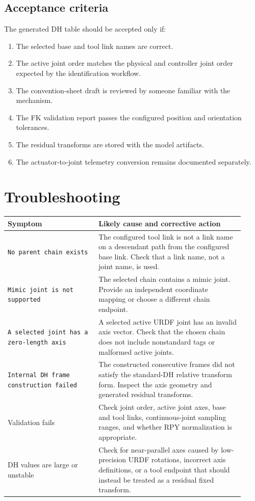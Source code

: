 \documentclass[11pt,a4paper]{article}
\begin{document}
\subsection{Acceptance criteria}

The generated DH table should be accepted only if:
\begin{enumerate}
  \item The selected base and tool link names are correct.
  \item The active joint order matches the physical and controller joint order expected by the identification workflow.
  \item The convention-sheet draft is reviewed by someone familiar with the mechanism.
  \item The FK validation report passes the configured position and orientation tolerances.
  \item The residual transforms are stored with the model artifacts.
  \item The actuator-to-joint telemetry conversion remains documented separately.
\end{enumerate}

\section{Troubleshooting}

\begin{longtable}{@{}p{0.35\linewidth}p{0.57\linewidth}@{}}
\toprule
Symptom & Likely cause and corrective action \\
\midrule
\texttt{No parent chain exists} & The configured tool link is not a link name on a descendant path from the configured base link. Check that a link name, not a joint name, is used. \\
\texttt{Mimic joint is not supported} & The selected chain contains a mimic joint. Provide an independent coordinate mapping or choose a different chain endpoint. \\
\texttt{A selected joint has a zero-length axis} & A selected active URDF joint has an invalid axis vector. Check that the chosen chain does not include nonstandard tags or malformed active joints. \\
\texttt{Internal DH frame construction failed} & The constructed consecutive frames did not satisfy the standard-DH relative transform form. Inspect the axis geometry and generated residual transforms. \\
Validation fails & Check joint order, active joint axes, base and tool links, continuous-joint sampling ranges, and whether RPY normalization is appropriate. \\
DH values are large or unstable & Check for near-parallel axes caused by low-precision URDF rotations, incorrect axis definitions, or a tool endpoint that should instead be treated as a residual fixed transform. \\
\bottomrule
\end{longtable}
\end{document}
